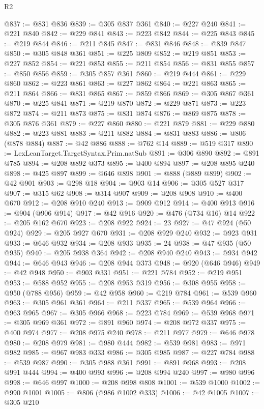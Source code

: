 \begin{lexlean}{R2}
\begin{coremodule}
@837 := @831 @836
@839 := @305 @837 @361
@840 := @227 @240
@841 := @221 @840
@842 := @229 @841
@843 := @223 @842
@844 := @225 @843
@845 := @219 @844
@846 := @211 @845
@847 := @831 @846
@848 := @839 @847
@850 := @305 @848 @361
@851 := @225 @809
@852 := @219 @851
@853 := @227 @852
@854 := @221 @853
@855 := @211 @854
@856 := @831 @855
@857 := @850 @856
@859 := @305 @857 @361
@860 := @219 @444
@861 := @229 @860
@862 := @223 @861
@863 := @227 @862
@864 := @221 @863
@865 := @211 @864
@866 := @831 @865
@867 := @859 @866
@869 := @305 @867 @361
@870 := @225 @841
@871 := @219 @870
@872 := @229 @871
@873 := @223 @872
@874 := @211 @873
@875 := @831 @874
@876 := @869 @875
@878 := @305 @876 @361
@879 := @227 @860
@880 := @221 @879
@881 := @229 @880
@882 := @223 @881
@883 := @211 @882
@884 := @831 @883
@886 := @806 (@878 @884)
@887 := @42 @886
@888 := @762 @14
@889 := @519 @317
@890 := LexLeanTarget.TargetSyntax.Prim.natSub
@891 := @306 @890
@892 := @891 @785
@894 := @208 @892 @373
@895 := @400 @894
@897 := @208 @895 @240
@898 := @425 @897
@899 := @646 @898
@901 := @888 (@889 @899)
@902 := @42 @901
@903 := @298 @18
@904 := @903 @14
@906 := @305 @527 @317
@907 := @315 @62
@908 := @314 @907
@909 := @208 @908
@910 := @400 @670
@912 := @208 @910 @240
@913 := @909 @912
@914 := @400 @913
@916 := @904 (@906 @914)
@917 := @42 @916
@920 := @476 (@734 @16) @14
@922 := @205 @162 @670
@923 := @208 @922
@924 := 23
@927 := @47 @924 (@50 @924)
@929 := @205 @927 @670
@931 := @208 @929 @240
@932 := @923 @931
@933 := @646 @932
@934 := @208 @933
@935 := 24
@938 := @47 @935 (@50 @935)
@940 := @205 @938 @364
@942 := @208 @940 @240
@943 := @934 @942
@944 := @646 @943
@946 := @208 @944 @373
@948 := @920 (@646 @946)
@949 := @42 @948
@950 := @903 @331
@951 := @221 @784
@952 := @219 @951
@953 := @588 @952
@955 := @208 @953 @319
@956 := @308 @955
@958 := @950 (@788 @956)
@959 := @42 @958
@960 := @219 @784
@961 := @539 @960
@963 := @305 @961 @361
@964 := @211 @337
@965 := @539 @964
@966 := @963 @965
@967 := @305 @966
@968 := @223 @784
@969 := @539 @968
@971 := @305 @969 @361
@972 := @891 @960
@974 := @208 @972 @337
@975 := @400 @974
@977 := @208 @975 @240
@978 := @211 @977
@979 := @646 @978
@980 := @208 @979
@981 := @980 @444
@982 := @539 @981
@983 := @971 @982
@985 := @967 @983 @333
@986 := @305 @985
@987 := @227 @784
@988 := @539 @987
@990 := @305 @988 @361
@991 := @891 @968
@993 := @208 @991 @444
@994 := @400 @993
@996 := @208 @994 @240
@997 := @980 @996
@998 := @646 @997
@1000 := @208 @998 @808
@1001 := @539 @1000
@1002 := @990 @1001
@1005 := @806 (@986 @1002 @333)
@1006 := @42 @1005
@1007 := @305 @210

\end{coremodule}
\end{lexlean}
